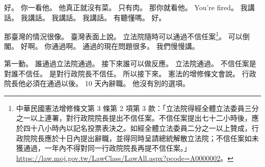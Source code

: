 \hypertarget{c01:cue:1276}{}好。
\hypertarget{c01:cue:1277}{}你一看他。
\hypertarget{c01:cue:1278}{}他真正就沒有菜。
\hypertarget{c01:cue:1279}{}只有肉。
\hypertarget{c01:cue:1280}{}那你就看他。
\hypertarget{c01:cue:1281}{}You're fired。
\hypertarget{c01:cue:1282}{}我講話。
\hypertarget{c01:cue:1283}{}我講話。
\hypertarget{c01:cue:1284}{}我講話。
\hypertarget{c01:cue:1285}{}我講話。
\hypertarget{c01:cue:1286}{}有聽懂嗎。
\hypertarget{c01:cue:1287}{}好。

\hypertarget{c01:cue:1288}{}那臺灣的情況很像。
\hypertarget{c01:cue:1289}{}臺灣表面上說。
\hypertarget{c01:cue:1290}{}立法院隨時可以通過不信任案\footnote{中華民國憲法增修條文第 3 條第 2 項第 3 款：「立法院得經全體立法委員三分之一以上連署，對行政院院長提出不信任案。不信任案提出七十二小時後，應於四十八小時內以記名投票表決之。如經全體立法委員二分之一以上贊成，行政院院長應於十日內提出辭職，並得同時呈請總統解散立法院；不信任案如未獲通過，一年內不得對同一行政院院長再提不信任案。」\url{https://law.moj.gov.tw/LawClass/LawAll.aspx?pcode=A0000002}。}。
\hypertarget{c01:cue:1291}{}可以倒閣。
\hypertarget{c01:cue:1292}{}好啊。
\hypertarget{c01:cue:1293}{}你通過啊。
\hypertarget{c01:cue:1294}{}通過的現在問題很多。
\hypertarget{c01:cue:1295}{}我們慢慢講。

\hypertarget{c01:cue:1296}{}第一動。
\hypertarget{c01:cue:1297}{}誰通過立法院通過。
\hypertarget{c01:cue:1298}{}接下來誰可以做反應。
\hypertarget{c01:cue:1299}{}立法院通過。
\hypertarget{c01:cue:1300}{}不信任案是對誰不信任。
\hypertarget{c01:cue:1301}{}是對行政院長不信任。
\hypertarget{c01:cue:1302}{}所以接下來。
\hypertarget{c01:cue:1303}{}憲法的增修條文會說。
\hypertarget{c01:cue:1304}{}行政院長他必須在通過以後。
\hypertarget{c01:cue:1305}{}10 天內辭職。
\hypertarget{c01:cue:1306}{}他沒有別的選項。


